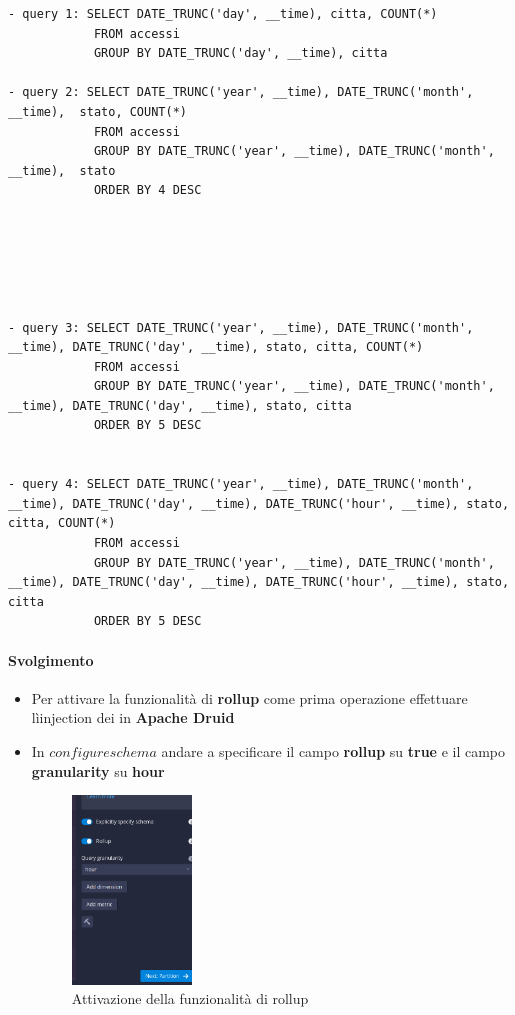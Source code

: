 \documentclass{article}
\begin{document}
\begin{lstlisting}
- query 1: SELECT DATE_TRUNC('day', __time), citta, COUNT(*)
            FROM accessi
            GROUP BY DATE_TRUNC('day', __time), citta

- query 2: SELECT DATE_TRUNC('year', __time), DATE_TRUNC('month', __time),  stato, COUNT(*)
            FROM accessi
            GROUP BY DATE_TRUNC('year', __time), DATE_TRUNC('month', __time),  stato
            ORDER BY 4 DESC






- query 3: SELECT DATE_TRUNC('year', __time), DATE_TRUNC('month', __time), DATE_TRUNC('day', __time), stato, citta, COUNT(*) 
            FROM accessi
            GROUP BY DATE_TRUNC('year', __time), DATE_TRUNC('month', __time), DATE_TRUNC('day', __time), stato, citta
            ORDER BY 5 DESC


- query 4: SELECT DATE_TRUNC('year', __time), DATE_TRUNC('month', __time), DATE_TRUNC('day', __time), DATE_TRUNC('hour', __time), stato, citta, COUNT(*) 
            FROM accessi
            GROUP BY DATE_TRUNC('year', __time), DATE_TRUNC('month', __time), DATE_TRUNC('day', __time), DATE_TRUNC('hour', __time), stato, citta
            ORDER BY 5 DESC

\end{lstlisting}
\paragraph{Svolgimento}
\begin{itemize}
    \item Per attivare la funzionalità di \textbf{rollup} come prima operazione effettuare lìinjection dei in \textbf{Apache Druid}
    \item In $configure schema$ andare a specificare il campo \textbf{rollup} su \textbf{true} e il campo \textbf{granularity} su \textbf{hour}
    \begin{figure}[H]
        \centering
        \includegraphics[width=0.3\textwidth]{images/test_rollup.png}
        \caption{Attivazione della funzionalità di rollup}
    \end{figure}
\end{itemize}
\end{document}
